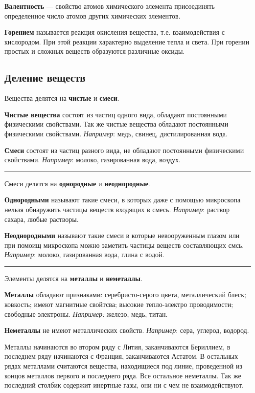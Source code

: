 \documentclass[12pt,a4paper]{article}
\begin{document}
{\bfseries Валентность} --- свойство атомов химического элемента присоединять определенное число атомов других химических элементов.

{\bfseries Горением} называется реакция окисления вещества, т.е. взаимодействия с кислородом. При этой реакции характерно выделение тепла и света. При горении простых и сложных веществ образуются различные оксиды.


\subsection{Деление веществ}

Вещества делятся на {\bfseries чистые} и {\bfseries смеси}.

{\bfseries Чистые вещества} состоят из частиц одного вида, обладают постоянными физическими свойствами. Так же чистые вещества обладают постоянными физическими свойствами. {\itshape Например}: медь, свинец, дистилированная вода.

{\bfseries Смеси} состоят из частиц разного вида, не обладают постоянными физическими свойствами. {\itshape Например}: молоко, газированная вода, воздух.

\medskip\hrule\medskip

Смеси делятся на {\bfseries однородные} и {\bfseries неоднородные}.

{\bfseries Однородными} называют такие смеси, в которых даже с помощью микроскопа нельзя обнаружить частицы веществ входящих в смесь. {\itshape Например}: раствор сахара, любые растворы.

{\bfseries Неоднородными} называют такие смеси в которые невооруженным глазом или при помоищ микроскопа можно заметить частицы веществ составляющих смсь. {\itshape Например}: молоко, газированная вода, глина с водой.

\medskip\hrule\medskip

Элементы делятся на {\bfseries металлы} и {\bfseries неметаллы}.

{\bfseries Металлы} обладают признаками: серебристо-серого цвета, металлический блеск; ковкость; имеют магнитные свойтсва;  высокие тепло-электро проводимости; свободные электроны. {\itshape Например:} железо, медь, титан.

{\bfseries Неметаллы} не имеют металлических свойств. {\itshape Например}: сера, углерод, водород.

Металлы начинаются во втором ряду с Лития, заканчиваются Бериллием, в последнем ряду начинаются с Франция, заканчиваются Астатом. В остальных рядах металлами считаются вещества, находищиеся под линие, проведенной из концов металлов первого и последнего ряда. Все остальное неметаллы. Так же последний столбик содержит инертные газы, они ни с чем не взаимодействуют.
\end{document}
